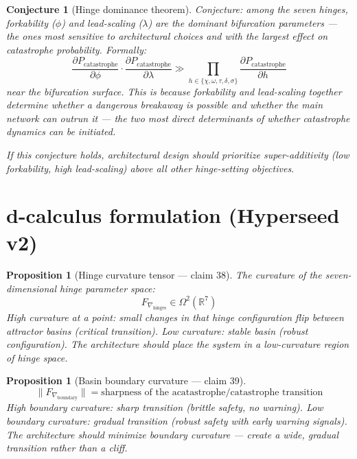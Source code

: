 \documentclass[11pt,a4paper]{article}
\newtheorem{proposition}[definition]{Proposition}
\newtheorem{conjecture}[definition]{Conjecture}
\begin{document}
\begin{conjecture}[Hinge dominance theorem]
Conjecture: among the seven hinges, forkability ($\phi$) and
lead-scaling ($\lambda$) are the dominant bifurcation parameters
--- the ones most sensitive to architectural choices and with the
largest effect on catastrophe probability. Formally:
\[
  \frac{\partial P_{\text{catastrophe}}}{\partial \phi} \cdot
  \frac{\partial P_{\text{catastrophe}}}{\partial \lambda} \gg
  \prod_{h \in \{\chi, \omega, \tau, \delta, \sigma\}}
  \frac{\partial P_{\text{catastrophe}}}{\partial h}
\]
near the bifurcation surface. This is because forkability and
lead-scaling together determine whether a dangerous breakaway
is possible and whether the main network can outrun it ---
the two most direct determinants of whether catastrophe
dynamics can be initiated.

If this conjecture holds, architectural design should
prioritize super-additivity (low forkability, high lead-scaling)
above all other hinge-setting objectives.
\end{conjecture}

\section{d-calculus formulation (Hyperseed v2)}

\begin{proposition}[Hinge curvature tensor --- claim 38]
\label{prop:hinge_curv}
The curvature of the seven-dimensional hinge parameter space:
\[
  F_{\nabla_{\text{hinges}}} \in \Omega^2(\mathbb{R}^7)
\]
High curvature at a point: small changes in that hinge configuration
flip between attractor basins (critical transition). Low curvature:
stable basin (robust configuration). The architecture should place
the system in a low-curvature region of hinge space.
\end{proposition}

\begin{proposition}[Basin boundary curvature --- claim 39]
\label{prop:basin_curv}
\[
  \|F_{\nabla_{\text{boundary}}}\| = \text{sharpness of the
    acatastrophe/catastrophe transition}
\]
High boundary curvature: sharp transition (brittle safety, no warning).
Low boundary curvature: gradual transition (robust safety with early
warning signals). The architecture should minimize boundary curvature
--- create a wide, gradual transition rather than a cliff.
\end{proposition}
\end{document}
